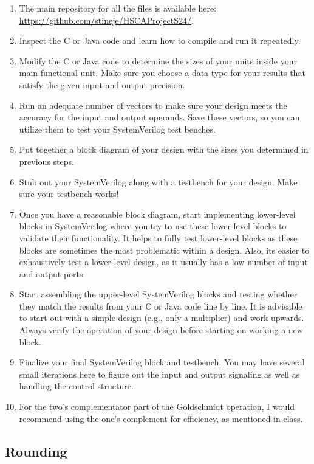 \documentclass[times, 10pt, twocolumn]{IEEEtran}
\begin{document}
\begin{enumerate}
\item The main repository for all the files is available here:
  \url{https://github.com/stineje/HSCAProjectS24/}.    
\item Inspect the C or Java code and learn how to compile and run it
  repeatedly.
\item Modify the C or Java code to determine the sizes of your units
  inside your main functional unit.  Make sure you choose a data type
  for your results that satisfy the given input and output precision.
\item Run an adequate number of vectors to make sure your design meets the
  accuracy for the input and output operands.  Save these vectors, so
  you can utilize them to test your SystemVerilog test
  benches.  
\item Put together a block diagram of your design with the sizes you
  determined in previous steps.
\item Stub out your SystemVerilog along with a testbench for your
  design.  Make sure your testbench works!
\item Once you have a reasonable block diagram, start implementing
  lower-level blocks in SystemVerilog where you try to use
  these lower-level blocks to validate their functionality.  It helps
  to fully test lower-level blocks as these blocks are
  sometimes the most problematic within a design.  Also, its easier to
  exhaustively test a lower-level design, as it usually has a low
  number of input and output ports.
\item Start assembling the upper-level SystemVerilog 
  blocks and testing whether they match the results from your C or
  Java code line by line.  
  It is advisable to start out with a simple design (e.g.,
  only a multiplier) and work upwards.  Always verify the operation of
  your design before starting on working a new block.
\item Finalize your final SystemVerilog block and testbench.  You may
  have several small iterations here to figure out the input and
  output signaling as well as handling the control structure.
\item For the two's complementator part of the Goldschmidt operation, I would
  recommend using the one's complement for efficiency,
  as mentioned in class.
\end{enumerate}

\subsection{Rounding}
\end{document}
